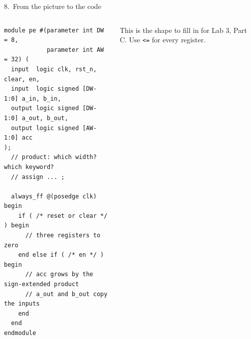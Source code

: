 \documentclass[aspectratio=169,11pt]{beamer}
\newcommand{\sig}[1]{\texttt{#1}}
\begin{document}
\begin{frame}[fragile]{8.\ From the picture to the code}
  \begin{columns}[T]
\begin{lstlisting}
module pe #(parameter int DW = 8,
            parameter int AW = 32) (
  input  logic clk, rst_n, clear, en,
  input  logic signed [DW-1:0] a_in, b_in,
  output logic signed [DW-1:0] a_out, b_out,
  output logic signed [AW-1:0] acc
);
  // product: which width? which keyword?
  // assign ... ;

  always_ff @(posedge clk) begin
    if ( /* reset or clear */ ) begin
      // three registers to zero
    end else if ( /* en */ ) begin
      // acc grows by the sign-extended product
      // a_out and b_out copy the inputs
    end
  end
endmodule
\end{lstlisting}
    \footnotesize This is the shape to fill in for Lab 3, Part C. Use \sig{<=} for every register.
  \end{columns}
\end{frame}
\end{document}
